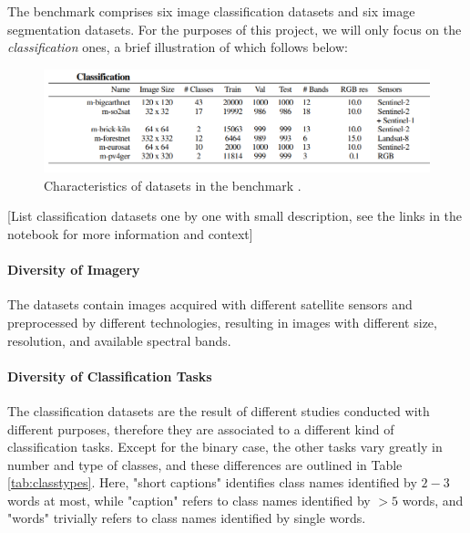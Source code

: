 \documentclass[a4paper, oneside, english]{sapthesis}
\begin{document}
The benchmark comprises six image classification datasets and six image segmentation datasets. For the purposes of this project, we will only focus on the \emph{classification} ones, a brief illustration of which follows below: \\

\begin{figure}[h]
    \centering
    \includegraphics[width=\textwidth]{img/geobench-datasets-classification-info-cut.png}
    \caption{Characteristics of datasets in the benchmark \cite{lacoste2023geo}.}
    \label{fig:geoinfo}
\end{figure}

[List classification datasets one by one with small description, see the links in the notebook for more information and context] 


\paragraph{Diversity of Imagery} The datasets contain images acquired with different satellite sensors and preprocessed by different technologies, resulting in images with different size, resolution, and available spectral bands.


\paragraph{Diversity of Classification Tasks} The classification datasets are the result of different studies conducted with different purposes, therefore they are associated to a different kind of classification tasks. Except for the binary case, the other tasks vary greatly in number and type of classes, and these differences are outlined in Table \ref{tab:classtypes}. Here, "short captions" identifies class names identified by $2-3$ words at most, while "caption" refers to class names identified by $>5$ words, and "words" trivially refers to class names identified by single words.
\end{document}
